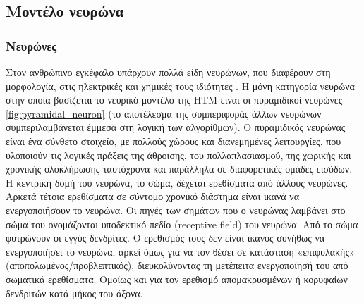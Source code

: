 \subsection{Μοντέλο νευρώνα} \label{htm:model_neuron}

	\subsubsection{Νευρώνες}

	Στον ανθρώπινο εγκέφαλο υπάρχουν πολλά είδη νευρώνων, που διαφέρουν στη μορφολογία, στις ηλεκτρικές και χημικές τους ιδιότητες \parencite{markramReconstructionSimulationNeocortical2015}.
	Η μόνη κατηγορία νευρώνα στην οποία βασίζεται το νευρικό μοντέλο της HTM είναι οι πυραμιδικοί νευρώνες \ref{fig:pyramidal_neuron}
	(το αποτέλεσμα της συμπεριφοράς άλλων νευρώνων συμπεριλαμβάνεται έμμεσα στη λογική των αλγορίθμων).
	Ο πυραμιδικός νευρώνας είναι ένα σύνθετο στοιχείο, με πολλούς χώρους και διανεμημένες λειτουργίες, που υλοποιούν τις λογικές πράξεις της άθροισης,
	του πολλαπλασιασμού, της χωρικής και χρονικής ολοκλήρωσης ταυτόχρονα και παράλληλα σε διαφορετικές ομάδες εισόδων.
	Η κεντρική δομή του νευρώνα, το σώμα, δέχεται ερεθίσματα από άλλους νευρώνες.
	Αρκετά τέτοια ερεθίσματα σε σύντομο χρονικό διάστημα είναι ικανά να ενεργοποιήσουν το νευρώνα.
	Οι πηγές των σημάτων που ο νευρώνας λαμβάνει στο σώμα του ονομάζονται υποδεκτικό πεδίο (receptive field) του νευρώνα.
	Από το σώμα φυτρώνουν οι εγγύς δενδρίτες. Ο ερεθισμός τους δεν είναι ικανός συνήθως να ενεργοποιήσει το νευρώνα, αρκεί όμως για να τον θέσει
	σε κατάσταση «επιφυλακής» (αποπολωμένος/προβλεπτικός), διευκολύνοντας τη μετέπειτα ενεργοποίησή του από σωματικά ερεθίσματα.
	Ομοίως και για τον ερεθισμό απομακρυσμένων ή κορυφαίων δενδριτών κατά μήκος του άξονα.

